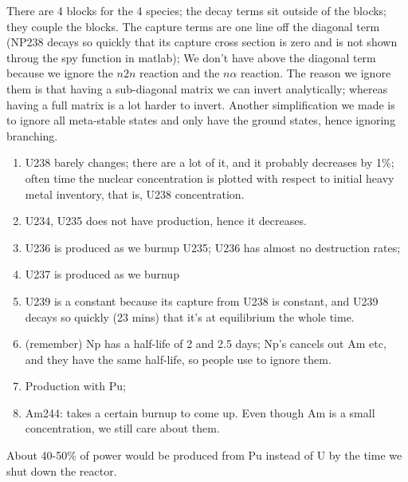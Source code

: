 \documentclass{school-22.211-notes}
\begin{document}
There are 4 blocks for the 4 species; the decay terms sit outside of the blocks; they couple the blocks. The capture terms are one line off the diagonal term (NP238 decays so quickly that its capture cross section is zero and is not shown throug the spy function in matlab); We don't have above the diagonal term because we ignore the $n2n$ reaction and the $n \alpha$ reaction. The reason we ignore them is that having a sub-diagonal matrix we can invert analytically; whereas having a full matrix is a lot harder to invert. Another simplification we made is to ignore all meta-stable states and only have the ground states, hence ignoring branching. 


\clearpage
{}
\begin{enumerate}
\item U238 barely changes; there are a lot of it, and it probably decreases by 1\%; often time the nuclear concentration is plotted with respect to initial heavy metal inventory, that is, U238 concentration. 
\item U234, U235 does not have production, hence it decreases. 
\item U236 is produced as we burnup U235; U236 has almost no destruction rates;
\item U237 is produced as we burnup 
\item U239 is a constant because its capture from U238 is constant, and U239 decays so quickly (23 mins) that it's at equilibrium the whole time. 
\item (remember) Np has a half-life of 2 and 2.5 days; Np's cancels out Am etc, and they have the same half-life, so people use to ignore them. 
\item Production with Pu; 
\item Am244: takes a certain burnup to come up. Even though Am is a small concentration, we still care about them. 
\end{enumerate}

About 40-50\% of power would be produced from Pu instead of U by the time we shut down the reactor. 
\end{document}
